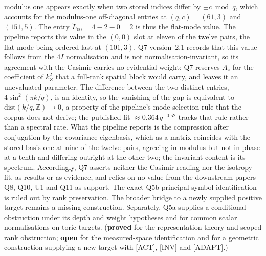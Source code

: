 \documentclass[11pt,a4paper]{article}
\newcommand{\sproved}{\textcolor{cproved}{\textbf{proved}}}
\newcommand{\sopen}{\textcolor{copen}{\textbf{open}}}
\begin{document}
    modulus one appears exactly when two stored indices differ by $\pm c \bmod q$, which accounts
    for the modulus-one off-diagonal entries at $(q,c)=(61,3)$ and $(151,5)$.
    The entry $\tilde L_{00} = 4-2-0 = 2$ is thus the flat-mode value.
    The pipeline reports this value in the $(0,0)$ slot at eleven of the twelve pairs, the flat mode being ordered
    last at $(101,3)$.
    Q7 version~2.1 records that this value follows from the $4I$ normalisation and is not
    normalisation-invariant, so its agreement with the Casimir carries no evidential weight; Q7 reserves $A_z$
    for the coefficient of $k_Z^2$ that a full-rank spatial block would carry, and leaves it an unevaluated
    parameter.
    The difference between the two distinct entries, $4\sin^2(\pi k/q)$, is an identity, so the
    vanishing of the gap is equivalent to $\mathrm{dist}(k/q,\mathbb{Z}) \to 0$, a property of the
    pipeline's mode-selection rule that the corpus does not derive; the published fit
    $\approx 0.364\,q^{-0.52}$ tracks that rule rather than a spectral rate.
    What the pipeline reports is the compression after conjugation by the covariance eigenbasis,
    which as a matrix coincides with the stored-basis one at nine of the twelve pairs, agreeing in
    modulus but not in phase at a tenth and differing outright at the other two; the invariant
    content is its spectrum.
    Accordingly, Q7 asserts neither the Casimir reading nor the isotropy fit, as results or as
    evidence, and relies on no value from the downstream papers Q8, Q10, U1 and Q11 as support.
    The exact Q5b principal-symbol identification is ruled out by rank preservation.
    The broader bridge to a newly supplied positive target remains a missing construction.
    Separately, Q5a supplies a conditional obstruction under its depth and weight hypotheses
    and for common scalar normalisations on toric targets.
    (\sproved{} for the representation theory and scoped rank obstruction;
    \sopen{} for the measured-space identification and for a geometric construction supplying
    a new target with [ACT], [INV] and [ADAPT].)
\end{document}
